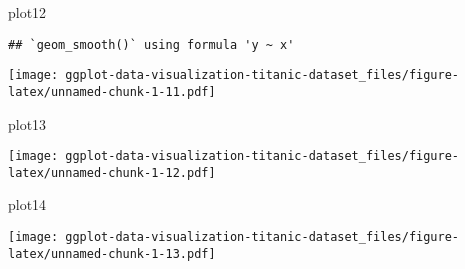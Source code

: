 \documentclass[
]{article}
\newenvironment{Shaded}{\begin{snugshade}}{\end{snugshade}}
\newcommand{\NormalTok}[1]{#1}
\begin{document}
\begin{Shaded}
\begin{Highlighting}[]
\NormalTok{plot12}
\end{Highlighting}
\end{Shaded}

\begin{verbatim}
## `geom_smooth()` using formula 'y ~ x'
\end{verbatim}

\texttt{[image: ggplot-data-visualization-titanic-dataset\_files/figure-latex/unnamed-chunk-1-11.pdf]}

\begin{Shaded}
\begin{Highlighting}[]
\NormalTok{plot13}
\end{Highlighting}
\end{Shaded}

\texttt{[image: ggplot-data-visualization-titanic-dataset\_files/figure-latex/unnamed-chunk-1-12.pdf]}

\begin{Shaded}
\begin{Highlighting}[]
\NormalTok{plot14}
\end{Highlighting}
\end{Shaded}

\texttt{[image: ggplot-data-visualization-titanic-dataset\_files/figure-latex/unnamed-chunk-1-13.pdf]}
\end{document}
